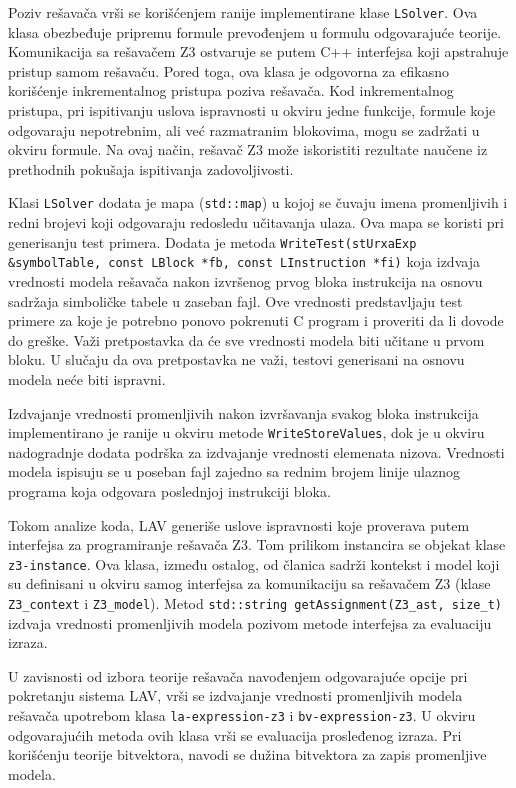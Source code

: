 \documentclass[12pt,oneside]{memoir}
\begin{document}
Poziv rešavača vrši se korišćenjem ranije implementirane klase \texttt{LSolver}. Ova klasa obezbeđuje pripremu formule prevođenjem u formulu odgovarajuće teorije. Komunikacija sa rešavačem Z3 ostvaruje se putem C++ interfejsa koji apstrahuje pristup samom rešavaču. Pored toga, ova klasa je odgovorna za efikasno korišćenje inkrementalnog pristupa poziva rešavača. Kod inkrementalnog pristupa, pri ispitivanju uslova ispravnosti u okviru jedne funkcije, formule koje odgovaraju nepotrebnim, ali već razmatranim blokovima, mogu se zadržati u okviru formule. Na ovaj način, rešavač Z3 može iskoristiti rezultate naučene iz prethodnih pokušaja ispitivanja zadovoljivosti.


Klasi \texttt{LSolver} dodata je mapa (\texttt{std::map}) u kojoj se čuvaju imena promenljivih i redni brojevi koji odgovaraju redosledu učitavanja ulaza. Ova mapa se koristi pri generisanju test primera. Dodata je metoda 
\texttt{WriteTest(stUrxaExp \&symbolTable, const LBlock *fb, const LInstruction *fi)} koja izdvaja vrednosti modela rešavača nakon izvršenog prvog bloka instrukcija na osnovu sadržaja simboličke tabele u zaseban fajl. Ove vrednosti predstavljaju test primere za koje je potrebno ponovo pokrenuti C program i proveriti da li dovode do greške. Važi pretpostavka da će sve vrednosti modela biti učitane u prvom bloku. U slučaju da ova pretpostavka ne važi, testovi generisani na osnovu modela neće biti ispravni.
\par
Izdvajanje vrednosti promenljivih nakon izvršavanja svakog bloka instrukcija implementirano je ranije u okviru metode \texttt{WriteStoreValues}, dok je u okviru nadogradnje dodata podrška za izdvajanje vrednosti elemenata nizova. Vrednosti modela ispisuju se u poseban fajl zajedno sa rednim brojem linije ulaznog programa koja odgovara poslednjoj instrukciji bloka.
\par
Tokom analize koda, LAV generiše uslove ispravnosti koje proverava putem interfejsa za programiranje rešavača Z3. Tom prilikom instancira se objekat klase \texttt{z3-instance}. Ova klasa, između ostalog, od članica sadrži kontekst i model koji su definisani u okviru samog interfejsa za komunikaciju sa rešavačem Z3 (klase \texttt{Z3\_context} i \texttt{Z3\_model}). Metod \texttt{std::string getAssignment(Z3\_ast, size\_t)} izdvaja vrednosti promenljivih modela pozivom metode interfejsa za evaluaciju izraza.
\par
U zavisnosti od izbora teorije rešavača navođenjem odgovarajuće opcije pri pokretanju sistema LAV, vrši se izdvajanje vrednosti promenljivih modela rešavača upotrebom klasa \texttt{la-expression-z3} i \texttt{bv-expression-z3}. U okviru odgovarajućih metoda ovih klasa vrši se evaluacija prosleđenog izraza. Pri korišćenju teorije bitvektora, navodi se dužina bitvektora za zapis promenljive modela.
\end{document}
